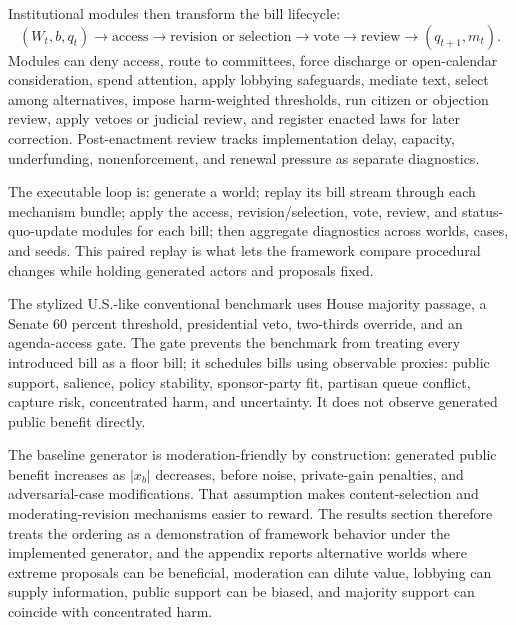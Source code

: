 \documentclass[manuscript]{acmart}
\begin{document}
Institutional modules then transform the bill lifecycle:
\[
(W_t,b,q_t)\rightarrow\text{access}\rightarrow\text{revision or selection}\rightarrow\text{vote}\rightarrow\text{review}\rightarrow(q_{t+1},m_t).
\]
Modules can deny access, route to committees, force discharge or open-calendar consideration, spend attention, apply lobbying safeguards, mediate text, select among alternatives, impose harm-weighted thresholds, run citizen or objection review, apply vetoes or judicial review, and register enacted laws for later correction. Post-enactment review tracks implementation delay, capacity, underfunding, nonenforcement, and renewal pressure as separate diagnostics.

The executable loop is: generate a world; replay its bill stream through each mechanism bundle; apply the access, revision/selection, vote, review, and status-quo-update modules for each bill; then aggregate diagnostics across worlds, cases, and seeds. This paired replay is what lets the framework compare procedural changes while holding generated actors and proposals fixed.

The stylized U.S.-like conventional benchmark uses House majority passage, a Senate 60 percent threshold, presidential veto, two-thirds override, and an agenda-access gate. The gate prevents the benchmark from treating every introduced bill as a floor bill; it schedules bills using observable proxies: public support, salience, policy stability, sponsor-party fit, partisan queue conflict, capture risk, concentrated harm, and uncertainty. It does not observe generated public benefit directly.

The baseline generator is moderation-friendly by construction: generated public benefit increases as \(|x_b|\) decreases, before noise, private-gain penalties, and adversarial-case modifications. That assumption makes content-selection and moderating-revision mechanisms easier to reward. The results section therefore treats the ordering as a demonstration of framework behavior under the implemented generator, and the appendix reports alternative worlds where extreme proposals can be beneficial, moderation can dilute value, lobbying can supply information, public support can be biased, and majority support can coincide with concentrated harm.
\end{document}
